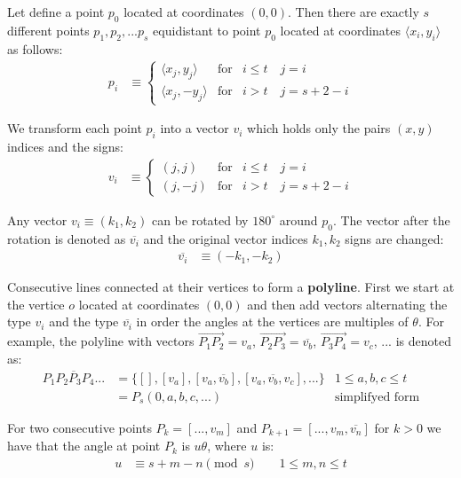 \documentclass[11pt]{article}
\begin{document}
Let define a point $p_0$ located at coordinates $(0,0)$. Then there are exactly $s$ different points $p_1, p_2, ... p_s$  equidistant to point $p_0$ located at coordinates $\langle x_i,y_i \rangle$ as follows:
\begin{align}
p_i &\equiv \left\{ \begin{array}{ccl}
 \langle x_j,y_j\rangle & \mbox{for} & i \leq t  \quad j = i\\
 \langle x_j, -y_j\rangle & \mbox{for} & i > t \quad j = s+2-i
 \end{array}\right. \label{eq:coords}
\end{align}

We transform each point $p_i$ into a vector $v_i$ which holds only the pairs $(x,y)$ indices and the signs:
\begin{align}
v_i &\equiv \left\{ \begin{array}{ccl}
 ( j, j ) & \mbox{for} & i \leq t \quad j = i\\
 ( j, -j ) & \mbox{for} & i > t \quad j = s+2-i
 \end{array}\right. \label{eq:vectors}
\end{align}

Any vector $v_i \equiv (k_1,k_2)$ can be rotated by $180^\circ$ around $p_0$. The vector after the rotation is denoted as $\overline{v_i}$ and the original vector indices $k_1,k_2$ signs are changed:
\begin{align}
\overline{v_i} &\equiv (-k_1, -k_2) \label{eq:vector180}
\end{align}

Consecutive lines connected at their vertices to form a \textbf{polyline}. First we start at the vertice $o$ located at coordinates $(0,0)$ and then add vectors alternating the type $v_i$ and the type $\overline{v_i}$ in order the angles at the vertices are multiples of $\theta$. For example, the polyline with vectors $\overrightarrow{P_1P_2}=v_a$, $\overrightarrow{P_2P_3}=\overline{v_b}$, $\overrightarrow{P_3P_4}=v_c$, ... is denoted as:
\begin{align}
\overline{P_1P_2P_3P_4...} &= \{ [], [v_a], [v_a,\overline{v_b}],[v_a,\overline{v_b},v_c],... \} 
 & 1 \leq a,b,c \leq t \\
 &= P_s(0,a,b,c,...) & \mbox{simplifyed form}
\end{align}

For two consecutive points $P_k = [...,v_m]$ and $P_{k+1} = [...,v_m,\overline{v_n}]$ for $k>0$ we have that the angle at point $P_k$ is $u\theta$, where $u$ is:
\begin{align}
u &\equiv s + m - n \pmod{s} \quad  \quad 1 \leq m,n \leq t \label{eq:angle}
\end{align}
\end{document}
